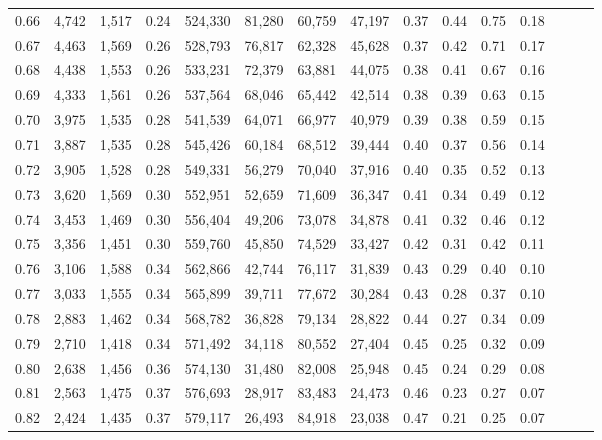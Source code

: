 \begin{tabular}{rrrrrrrrrrrrrrr}
0.66 &   4,742 &  1,517 &  0.24 &  524,330 &   81,280 &   60,759 &   47,197 &  0.37 &  0.44 &  0.75 &      0.18 \\
0.67 &   4,463 &  1,569 &  0.26 &  528,793 &   76,817 &   62,328 &   45,628 &  0.37 &  0.42 &  0.71 &      0.17 \\
0.68 &   4,438 &  1,553 &  0.26 &  533,231 &   72,379 &   63,881 &   44,075 &  0.38 &  0.41 &  0.67 &      0.16 \\
0.69 &   4,333 &  1,561 &  0.26 &  537,564 &   68,046 &   65,442 &   42,514 &  0.38 &  0.39 &  0.63 &      0.15 \\
0.70 &   3,975 &  1,535 &  0.28 &  541,539 &   64,071 &   66,977 &   40,979 &  0.39 &  0.38 &  0.59 &      0.15 \\
0.71 &   3,887 &  1,535 &  0.28 &  545,426 &   60,184 &   68,512 &   39,444 &  0.40 &  0.37 &  0.56 &      0.14 \\
0.72 &   3,905 &  1,528 &  0.28 &  549,331 &   56,279 &   70,040 &   37,916 &  0.40 &  0.35 &  0.52 &      0.13 \\
0.73 &   3,620 &  1,569 &  0.30 &  552,951 &   52,659 &   71,609 &   36,347 &  0.41 &  0.34 &  0.49 &      0.12 \\
0.74 &   3,453 &  1,469 &  0.30 &  556,404 &   49,206 &   73,078 &   34,878 &  0.41 &  0.32 &  0.46 &      0.12 \\
0.75 &   3,356 &  1,451 &  0.30 &  559,760 &   45,850 &   74,529 &   33,427 &  0.42 &  0.31 &  0.42 &      0.11 \\
0.76 &   3,106 &  1,588 &  0.34 &  562,866 &   42,744 &   76,117 &   31,839 &  0.43 &  0.29 &  0.40 &      0.10 \\
0.77 &   3,033 &  1,555 &  0.34 &  565,899 &   39,711 &   77,672 &   30,284 &  0.43 &  0.28 &  0.37 &      0.10 \\
0.78 &   2,883 &  1,462 &  0.34 &  568,782 &   36,828 &   79,134 &   28,822 &  0.44 &  0.27 &  0.34 &      0.09 \\
0.79 &   2,710 &  1,418 &  0.34 &  571,492 &   34,118 &   80,552 &   27,404 &  0.45 &  0.25 &  0.32 &      0.09 \\
0.80 &   2,638 &  1,456 &  0.36 &  574,130 &   31,480 &   82,008 &   25,948 &  0.45 &  0.24 &  0.29 &      0.08 \\
0.81 &   2,563 &  1,475 &  0.37 &  576,693 &   28,917 &   83,483 &   24,473 &  0.46 &  0.23 &  0.27 &      0.07 \\
0.82 &   2,424 &  1,435 &  0.37 &  579,117 &   26,493 &   84,918 &   23,038 &  0.47 &  0.21 &  0.25 &      0.07 \\

\end{tabular}
